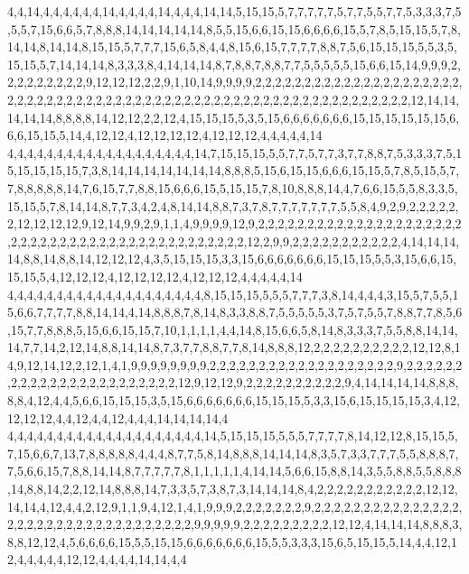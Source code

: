 4,4,14,4,4,4,4,4,4,14,4,4,4,4,14,4,4,4,14,14,5,15,15,5,7,7,7,7,7,5,7,7,5,5,7,7,5,3,3,3,7,5,5,5,7,15,6,6,5,7,8,8,8,14,14,14,14,14,8,5,5,15,6,6,15,15,6,6,6,6,15,5,7,8,5,15,15,5,7,8,14,14,8,14,14,8,15,15,5,7,7,7,15,6,5,8,4,4,8,15,6,15,7,7,7,7,8,8,7,5,6,15,15,15,5,5,3,5,15,15,5,7,14,14,14,8,3,3,3,8,4,14,14,14,8,7,8,8,7,8,8,7,7,5,5,5,5,5,15,6,6,15,14,9,9,9,2,2,2,2,2,2,2,2,2,9,12,12,12,2,2,9,1,10,14,9,9,9,9,2,2,2,2,2,2,2,2,2,2,2,2,2,2,2,2,2,2,2,2,2,2,2,2,2,2,2,2,2,2,2,2,2,2,2,2,2,2,2,2,2,2,2,2,2,2,2,2,2,2,2,2,2,2,2,2,2,2,2,2,2,2,12,14,14,14,14,14,8,8,8,8,14,12,12,2,2,12,4,15,15,15,5,3,5,15,6,6,6,6,6,6,6,15,15,15,15,15,15,6,6,6,15,15,5,14,4,12,12,4,12,12,12,12,4,12,12,12,4,4,4,4,4,14
4,4,4,4,4,4,4,4,4,4,4,4,4,4,4,4,4,4,4,14,7,15,15,15,5,5,7,7,5,7,7,3,7,7,8,8,7,5,3,3,3,7,5,15,15,15,15,15,7,3,8,14,14,14,14,14,14,14,8,8,8,5,15,6,15,15,6,6,6,15,15,5,7,8,5,15,5,7,7,8,8,8,8,8,14,7,6,15,7,7,8,8,15,6,6,6,15,5,15,15,7,8,10,8,8,8,14,4,7,6,6,15,5,5,8,3,3,5,15,15,5,7,8,14,14,8,7,7,3,4,2,4,8,14,14,8,8,7,3,7,8,7,7,7,7,7,7,7,5,5,8,4,9,2,9,2,2,2,2,2,2,12,12,12,12,9,12,14,9,9,2,9,1,1,4,9,9,9,9,12,9,2,2,2,2,2,2,2,2,2,2,2,2,2,2,2,2,2,2,2,2,2,2,2,2,2,2,2,2,2,2,2,2,2,2,2,2,2,2,2,2,2,2,2,2,2,12,2,9,9,2,2,2,2,2,2,2,2,2,2,2,4,14,14,14,14,8,8,14,8,8,14,12,12,12,4,3,5,15,15,15,3,3,15,6,6,6,6,6,6,6,15,15,15,5,5,3,15,6,6,15,15,15,5,4,12,12,12,4,12,12,12,12,4,12,12,12,4,4,4,4,4,14
4,4,4,4,4,4,4,4,4,4,4,4,4,4,4,4,4,4,4,4,8,15,15,15,5,5,5,7,7,7,3,8,14,4,4,4,3,15,5,7,5,5,15,6,6,7,7,7,7,8,8,14,14,4,14,8,8,8,7,8,14,8,3,3,8,8,7,5,5,5,5,5,3,7,5,7,5,5,7,8,8,7,7,8,5,6,15,7,7,8,8,8,5,15,6,6,15,15,7,10,1,1,1,1,4,4,14,8,15,6,6,5,8,14,8,3,3,3,7,5,5,8,8,14,14,14,7,7,14,2,12,14,8,8,14,14,8,7,3,7,7,8,8,7,7,8,14,8,8,8,12,2,2,2,2,2,2,2,2,2,2,12,12,8,14,9,12,14,12,2,12,1,4,1,9,9,9,9,9,9,9,9,2,2,2,2,2,2,2,2,2,2,2,2,2,2,2,2,2,2,2,9,2,2,2,2,2,2,2,2,2,2,2,2,2,2,2,2,2,2,2,2,2,2,2,12,9,12,12,9,2,2,2,2,2,2,2,2,2,2,9,4,14,14,14,14,8,8,8,8,8,4,12,4,4,5,6,6,15,15,15,3,5,15,6,6,6,6,6,6,6,15,15,15,5,3,3,15,6,15,15,15,15,3,4,12,12,12,12,4,4,12,4,4,12,4,4,4,14,14,14,14,4
4,4,4,4,4,4,4,4,4,4,4,4,4,4,4,4,4,4,4,4,14,5,15,15,15,5,5,5,7,7,7,7,8,14,12,12,8,15,15,5,7,15,6,6,7,13,7,8,8,8,8,8,4,4,4,8,7,7,5,8,14,8,8,8,14,14,14,8,3,5,7,3,3,7,7,7,5,5,8,8,8,7,7,5,6,6,15,7,8,8,14,14,8,7,7,7,7,7,8,1,1,1,1,1,4,14,14,5,6,6,15,8,8,14,3,5,5,8,8,5,5,8,8,8,14,8,8,14,2,2,12,14,8,8,8,14,7,3,3,5,7,3,8,7,3,14,14,14,8,4,2,2,2,2,2,2,2,2,2,2,2,12,12,14,14,4,12,4,4,2,12,9,1,1,9,4,12,1,4,1,9,9,9,2,2,2,2,2,2,2,9,2,2,2,2,2,2,2,2,2,2,2,2,2,2,2,2,2,2,2,2,2,2,2,2,2,2,2,2,2,2,2,2,2,2,9,9,9,9,9,2,2,2,2,2,2,2,2,2,12,12,4,14,14,14,8,8,8,3,8,8,12,12,4,5,6,6,6,6,15,5,5,15,15,6,6,6,6,6,6,6,15,5,5,3,3,3,15,6,5,15,15,5,14,4,4,12,12,4,4,4,4,4,12,12,4,4,4,4,14,14,4,4
